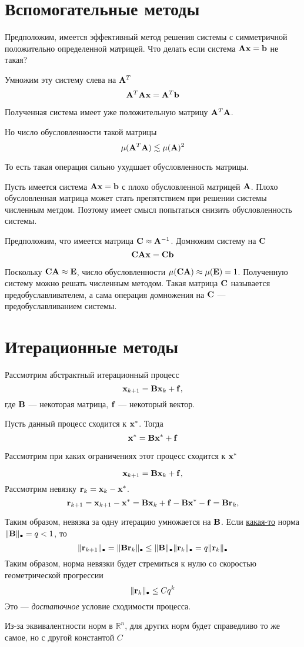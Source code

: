 \documentclass[professionalfonts,compress,unicode]{beamer}
\begin{document}
\section{Вспомогательные методы}
{
	Предположим, имеется эффективный метод решения системы с симметричной положительно определенной матрицей.
	Что делать если система ${\bf A}{\bf x} = {\bf b}$ не такая?
	\pause
	
	Умножим эту систему слева на ${\bf A}^T$
	$$
	{\bf A}^T {\bf A} {\bf x} = {\bf A}^T {\bf b}
	$$
	
	Полученная система имеет уже положительную матрицу ${\bf A}^T{\bf A}$. 
	
	\pause
	Но число обусловленности такой матрицы
	$$
	\mu({\bf A}^T{\bf A}) \lesssim \mu({\bf A})^2
	$$
	
	То есть такая операция сильно ухудшает обусловленность матрицы.
}

{
	Пусть имеется система ${\bf A}{\bf x} = {\bf b}$ с плохо обусловленной матрицей ${\bf A}$. Плохо обусловленная матрица
	может стать препятствием при решении системы численным метдом. Поэтому имеет смысл попытаться снизить
	обусловленность системы. 
	\pause
	
	Предположим, что имеется матрица ${\bf C} \approx {\bf A}^{-1}$. Домножим систему на ${\bf C}$
	$$
	{\bf C}{\bf A}{\bf x} = {\bf C}{\bf b}
	$$
	
	Поскольку ${\bf C}{\bf A} \approx {\bf E}$, число обусловленности $\mu({\bf C}{\bf A}) \approx \mu({\bf E}) = 1$. 
	Полученную систему можно решать численным методом.
	Такая матрица ${\bf C}$ называется 
	предобуславливателем, а сама операция домножения на ${\bf C}$ --- предобуславливанием системы.
}

\section{Итерационные методы}
{
	Рассмотрим абстрактный итерационный процесс
	$$
	{\bf x}_{k+1} = {\bf B} {\bf x}_k + {\bf f},
	$$
	где ${\bf B}$ --- некоторая матрица, ${\bf f}$ --- некоторый вектор.
	
	Пусть данный процесс сходится к ${\bf x}^*$. Тогда 
	$$
	{\bf x}^* = {\bf B} {\bf x}^* + {\bf f}
	$$
	
	Рассмотрим при каких ограничениях этот процесс сходится к ${\bf x}^*$
}

{
	$$
	{\bf x}_{k+1} = {\bf B} {\bf x}_k + {\bf f},
	$$
	Рассмотрим невязку ${\bf r}_k = {\bf x}_k - {\bf x}^*$. 
	$$
	{\bf r}_{k+1} = {\bf x}_{k+1}-{\bf x}^* = {\bf B} {\bf x}_k + {\bf f}-{\bf B} {\bf x}^* - {\bf f} = {\bf B} {\bf r}_k,
	$$
	
	Таким образом, невязка за одну итерацию умножается на ${\bf B}$. Если \underline{какая-то} норма 
	$\|{\bf B}\|_\bullet = q < 1$, то 
	$$
	\|{\bf r}_{k+1}\|_\bullet = \|{\bf B}{\bf r}_k\|_\bullet \leq \|{\bf B}\|_\bullet \|{\bf r}_k\|_\bullet = q \| {\bf r}_k \|_\bullet
	$$
	Таким образом, норма невязки будет стремиться к нулю со скоростью геометрической прогрессии
	$$
	\|{\bf r}_k\|_\bullet \leq C q^k
	$$
	Это --- \emph{достаточное} условие сходимости процесса.

	Из-за эквивалентности норм в $\mathbb{R}^n$, для других норм будет справедливо то же самое, но с другой константой $C$
}
\end{document}
